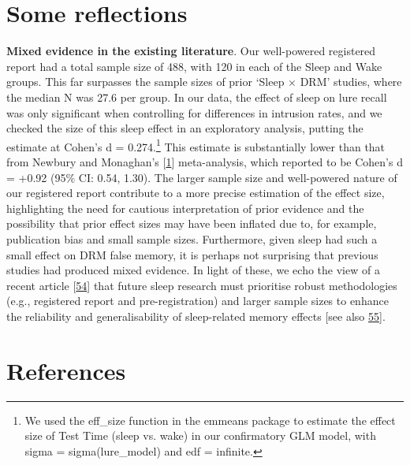 \documentclass[
]{article}
\begin{document}
\hypertarget{some-reflections}{%
\section{Some reflections}\label{some-reflections}}

\textbf{Mixed evidence in the existing literature}. Our well-powered registered report had a total sample size of 488, with 120 in each of the Sleep and Wake groups. This far surpasses the sample sizes of prior `Sleep \(\times\) DRM' studies, where the median N was 27.6 per group. In our data, the effect of sleep on lure recall was only significant when controlling for differences in intrusion rates, and we checked the size of this sleep effect in an exploratory analysis, putting the estimate at Cohen's d = 0.274.\footnote{We used the eff\_size function in the emmeans package to estimate the effect size of Test Time (sleep vs. wake) in our confirmatory GLM model, with sigma = sigma(lure\_model) and edf = infinite.} This estimate is substantially lower than that from Newbury and Monaghan's {[}\protect\hyperlink{ref-newbury2019a}{1}{]} meta-analysis, which reported to be Cohen's d = +0.92 (95\% CI: 0.54, 1.30). The larger sample size and well-powered nature of our registered report contribute to a more precise estimation of the effect size, highlighting the need for cautious interpretation of prior evidence and the possibility that prior effect sizes may have been inflated due to, for example, publication bias and small sample sizes. Furthermore, given sleep had such a small effect on DRM false memory, it is perhaps not surprising that previous studies had produced mixed evidence. In light of these, we echo the view of a recent article {[}\protect\hyperlink{ref-cordi2021a}{54}{]} that future sleep research must prioritise robust methodologies (e.g., registered report and pre-registration) and larger sample sizes to enhance the reliability and generalisability of sleep-related memory effects {[}see also \protect\hyperlink{ref-nemeth2019a}{55}{]}.

\hypertarget{references}{%
\section*{References}\label{references}}
\end{document}

